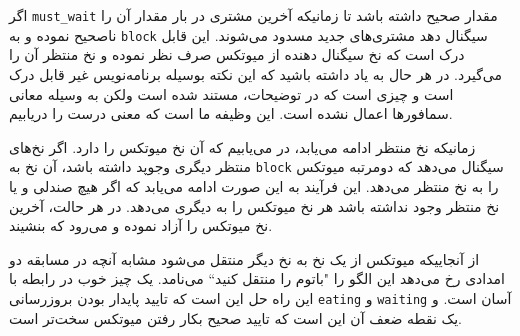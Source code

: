 \documentclass{book}
\newcommand{\clearemptydoublepage}{\newpage\cleardoublepage}
\begin{document}
    اگر {\tt must\_wait} مقدار صحیح داشته باشد تا زمانیکه آخرین مشتری در بار مقدار آن را ناصحیح نموده و به  {\tt block} سیگنال دهد مشتری‌های جدید 
    مسدود می‌شوند. این قابل درک است که نخ سیگنال دهنده از میوتکس صرف نظر نموده و نخ منتظر آن را می‌گیرد. در هر حال  به یاد داشته باشید که 
    این نکته بوسیله برنامه‌نویس غیر قابل درک است و چیزی است که در توضیحات، مستند شده است 
    ولکن به وسیله معانی سمافورها اعمال نشده است. این وظیفه ما است که معنی درست را دریابیم.

    زمانیکه نخ منتظر ادامه می‌یابد، در می‌یابیم که آن نخ میوتکس را دارد. اگر نخ‌های منتظر دیگری وجوپد داشته باشد، آن نخ به  {\tt block} سیگنال می‌دهد که 
    دومرتبه میوتکس را به نخ منتظر می‌دهد. این فرآیند به این صورت ادامه می‌یابد که  اگر هیچ صندلی و یا نخ منتظر وجود نداشته باشد هر نخ میوتکس را
    به دیگری می‌دهد. در هر حالت، آخرین نخ میوتکس را آزاد نموده و می‌رود که بنشیند. 
    

    از آنجاییکه میوتکس از یک نخ به نخ دیگر منتقل می‌شود مشابه آنچه در مسابقه دو امدادی رخ می‌دهد 
    این الگو را "باتوم را منتقل کنید‍‍`` می‌نامد.
    یک چیز خوب در رابطه با این راه حل این است که تایید پایدار بودن بروزرسانی  {\tt eating} و {\tt waiting} آسان است. و  یک نقطه ضعف آن 
    این است که تایید صحیح بکار رفتن میوتکس سخت‌تر است. 

\end{document}
